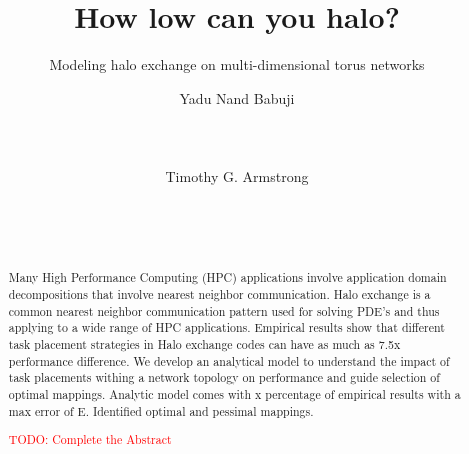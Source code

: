 \documentclass{acm_proc_article-sp}
\begin{document}
\setlength{\pdfpageheight}{\paperheight}
\setlength{\pdfpagewidth}{\paperwidth}


\newcommand{\timnote}[1]{ {\textcolor{maroon} { Tim: #1 }}}
\newcommand{\todo}[1]{ {\textcolor{red} { TODO: #1 }}}

\title{How low can you halo?}
\subtitle{Modeling halo exchange on multi-dimensional torus networks}


\author{
\alignauthor
Yadu Nand Babuji\\
       \\
       \\
       \\
\alignauthor
Timothy G. Armstrong\\
       \\
       \\
       \\
}
\maketitle

\begin{abstract}
Many High Performance Computing (HPC) applications involve application domain decompositions that involve nearest neighbor communication.
Halo exchange is a common nearest neighbor communication pattern used for solving PDE's and thus applying to a wide range of HPC applications.
Empirical results show that different task placement strategies in Halo exchange codes can have as much as 7.5x performance difference.
We develop an analytical model to understand the impact of task placements withing a network topology on performance and guide selection of
optimal mappings.
Analytic model comes with x percentage of empirical results with a max error of E.
Identified optimal and pessimal mappings.

\todo{Complete the Abstract}

\end{abstract}
\end{document}
